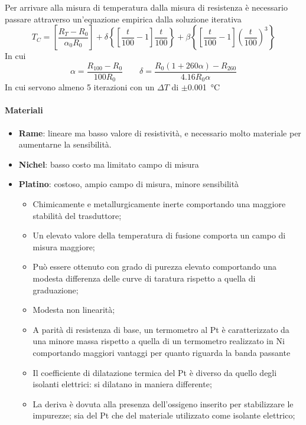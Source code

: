\documentclass[a4paper, 15pt]{article}
\newcommand{\cmark}{\ding{51}}
\newcommand{\xmark}{\ding{55}}
\begin{document}
\begin{adjustwidth}{2in}{}
	Per arrivare alla misura di temperatura dalla misura di resistenza è necessario passare attraverso un'equazione empirica dalla soluzione iterativa
	\[T_C = \left[\dfrac{R_T-R_0}{\alpha_0R_0}\right] + \delta\left\{\left[\dfrac{t}{100}-1\right]\dfrac{t}{100}\right\} + \beta\left\{\left[\dfrac{t}{100}-1\right]\left(\dfrac{t}{100}\right)^3\right\}\]
	In cui
	\[\alpha = \dfrac{R_{100}-R_0}{100R_0}\qquad\delta = \dfrac{R_0(1+260\alpha)-R_{260}}{4.16R_0\alpha}\]
	In cui servono almeno 5 iterazioni con un $\Delta T$ di $\pm$\SI{0.001}{\celsius}
	
	\paragraph{Materiali} 
	\begin{itemize}
		\item \textbf{Rame}: lineare ma basso valore di resistività, e necessario molto materiale per aumentarne la sensibilità.
		\item \textbf{Nichel}: basso costo ma limitato campo di misura
		\item \textbf{Platino}: costoso, ampio campo di misura, minore sensibilità
		\begin{itemize}[label = \textcolor{green}{\cmark}]
			\item Chimicamente e metallurgicamente inerte comportando una maggiore stabilità del trasduttore;
			\item Un elevato valore della temperatura di fusione comporta un campo di misura maggiore;
			\item Può essere ottenuto con grado di purezza elevato comportando una modesta differenza delle curve di taratura rispetto a quella di graduazione;
			\item Modesta non linearità;
			\item A parità di resistenza di base, un termometro al Pt è caratterizzato da una minore massa rispetto a quella di un termometro realizzato in Ni comportando maggiori vantaggi per quanto riguarda la banda passante
		\end{itemize}
		\begin{itemize}[label = \textcolor{red}{\xmark}]
		\item Il coefficiente di dilatazione termica del Pt è diverso da quello degli isolanti elettrici: si dilatano in maniera differente;
		\item La deriva è dovuta alla presenza dell'ossigeno inserito per stabilizzare le impurezze; 
		sia del Pt che del materiale utilizzato come isolante elettrico;

\end{itemize}
\end{itemize}
\end{adjustwidth}
\end{document}
